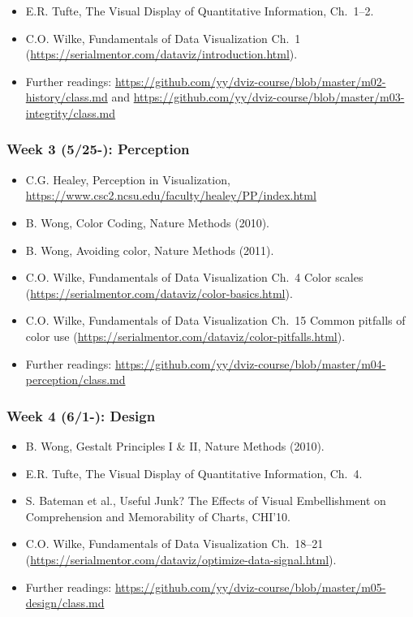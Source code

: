\documentclass[11pt,article,oneside]{memoir} %
\begin{document}
\begin{itemize}\itemsep0em 
\item E.R. Tufte, The Visual Display of Quantitative Information, Ch.~1--2.
\item C.O. Wilke, Fundamentals of Data Visualization Ch.~1 (\url{https://serialmentor.com/dataviz/introduction.html}). 
\item Further readings: \url{https://github.com/yy/dviz-course/blob/master/m02-history/class.md} and \url{https://github.com/yy/dviz-course/blob/master/m03-integrity/class.md}
\end{itemize}	


\subsubsection{Week 3 (5/25-): Perception}%

\begin{itemize}\itemsep0em 
\item C.G. Healey, Perception in Visualization, \url{https://www.csc2.ncsu.edu/faculty/healey/PP/index.html}
\item B. Wong, Color Coding, Nature Methods (2010).
\item B. Wong, Avoiding color, Nature Methods (2011). 
\item C.O. Wilke, Fundamentals of Data Visualization Ch.~4 Color scales (\url{https://serialmentor.com/dataviz/color-basics.html}). 
\item C.O. Wilke, Fundamentals of Data Visualization Ch.~15 Common pitfalls of color use (\url{https://serialmentor.com/dataviz/color-pitfalls.html}).
\item Further readings: \url{https://github.com/yy/dviz-course/blob/master/m04-perception/class.md}
\end{itemize}	
\subsubsection{Week 4 (6/1-): Design }%

\begin{itemize}\itemsep0em 
\item B. Wong, Gestalt Principles I \& II, Nature Methods (2010). 
\item E.R. Tufte, The Visual Display of Quantitative Information, Ch.~4.
\item S. Bateman et al., Useful Junk? The Effects of Visual Embellishment on Comprehension and Memorability of Charts, CHI'10.
\item C.O. Wilke, Fundamentals of Data Visualization Ch.~18--21 (\url{https://serialmentor.com/dataviz/optimize-data-signal.html}). 
\item Further readings: \url{https://github.com/yy/dviz-course/blob/master/m05-design/class.md}
\end{itemize}	
\end{document}
